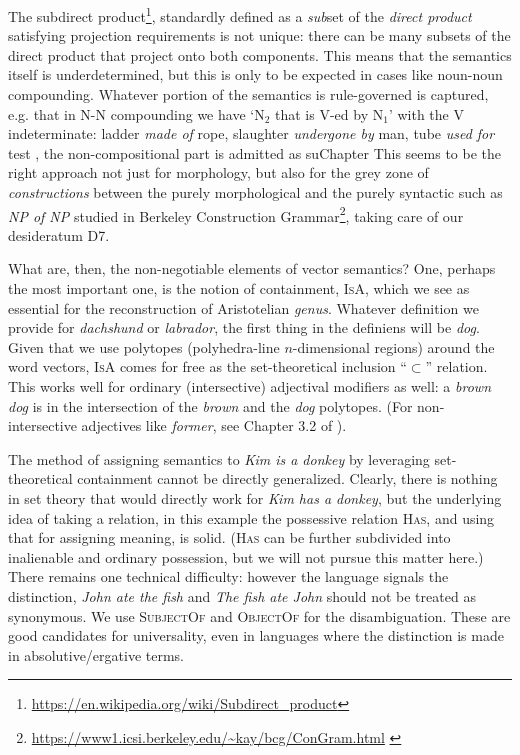 \documentclass[output=paper,colorlinks=true,citecolor=brown]{langscibook}
\begin{document}
The subdirect product\footnote{\url{https://en.wikipedia.org/wiki/Subdirect_product}},
standardly defined as a \textit{sub}set of the \textit{direct product} satisfying
projection requirements is not unique: there can be many subsets of the direct
product that project onto both components. This means that the semantics
itself is underdetermined, but this is only to be expected in cases like
noun-noun compounding. Whatever portion of the semantics is rule-governed is
captured, e.g. that in N-N compounding we have `N$_2$ that is V-ed by N$_1$'
with the V indeterminate: ladder \textit{made of} rope, slaughter \textit{undergone
  by} man, tube \textit{used for} test \citep{Kiparsky:1982b}, the
non-compositional part is admitted as suChapter This seems to be the right approach
not just for morphology, but also for the grey zone of \textit{constructions}
between the purely morphological and the purely syntactic such as \textit{NP of
  NP} studied in Berkeley Construction Grammar\footnote{\url{https://www1.icsi.berkeley.edu/~kay/bcg/ConGram.html} \citep{Kornai:1988a}}, taking care of our desideratum
D7.

What are, then, the non-negotiable elements of vector
semantics? One, perhaps the most important one, is the notion of containment,
\textsc{IsA}, which we see as essential for the reconstruction of Aristotelian
\textit{genus}. Whatever definition we provide for \textit{dachshund} or \textit{labrador}, the first thing in the definiens will be \textit{dog}. Given that we
use polytopes (polyhedra-line $n$-dimensional regions) around the word
vectors, \textsc{IsA} comes for free as the set-theoretical inclusion “$\subset$”
relation. This works well for ordinary (intersective) adjectival modifiers
as well: a \textit{brown dog} is in the intersection of the \textit{brown} and the
\textit{dog} polytopes. (For non-intersective adjectives like \textit{former}, see
Chapter 3.2 of \cite{Kornai:2022}).

The method of assigning semantics to \textit{Kim is a donkey} by leveraging
set-theo\-ret\-ical containment cannot be directly generalized.  Clearly,
there is nothing in set theory that would directly work for \textit{Kim has a
  donkey}, but the underlying idea of taking a relation, in this example the
possessive relation \textsc{Has}, and using that for assigning meaning, is
solid. (\textsc{Has} can be further subdivided into inalienable and ordinary
possession, but we will not pursue this matter here.) There remains one
technical difficulty: however the language signals the distinction, \textit{John
  ate the fish} and \textit{The fish ate John} should not be treated as
synonymous. We use \textsc{SubjectOf} and \textsc{ObjectOf} for the
disambiguation. These are good candidates for universality, even in languages
where the distinction is made in absolutive/ergative terms.
\end{document}
